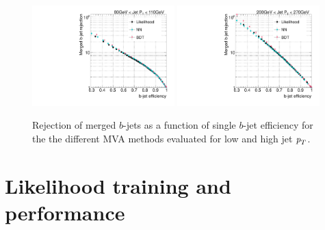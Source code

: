 \begin{figure}[tp]
\centering
\includegraphics[width=0.49\textwidth]{FIGS/TEMPFigs/MVA_differentMethods/bins/MVAs_RejvsEff80.pdf}
\includegraphics[width=0.49\textwidth]{FIGS/TEMPFigs/MVA_differentMethods/bins/MVAs_RejvsEff200.pdf}
\caption{Rejection of merged $b$-jets as a function of single $b$-jet efficiency for the the different MVA methods evaluated for low and high jet ${\emph{p}_{T}}$.}
\label{fig:diffmethodsPerfBins}
\end{figure}



\section{Likelihood training and performance}


